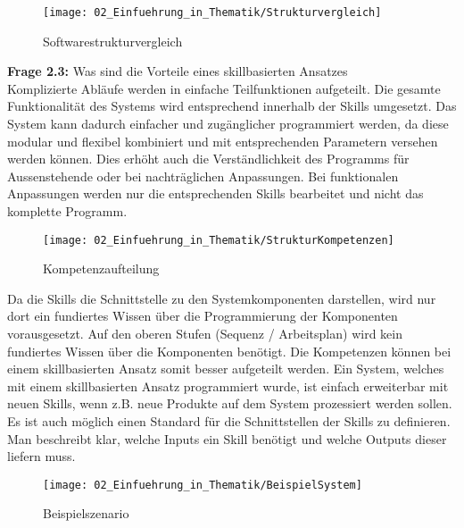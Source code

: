 		\begin{figure}[h!]
			\centering
			\texttt{[image: 02\_Einfuehrung\_in\_Thematik/Strukturvergleich]}
			\captionsetup{justification=centering}
			\caption{Softwarestrukturvergleich}
			\label{fig:Softwarestrukturvergleich}
		\end{figure}
	
	\vspace{3mm}
	
	\textbf{Frage 2.3:} Was sind die Vorteile eines skillbasierten Ansatzes \vspace{2mm} 
	\\
		Komplizierte Abläufe werden in einfache Teilfunktionen aufgeteilt. Die gesamte Funktionalität des Systems wird entsprechend innerhalb der Skills umgesetzt. Das System kann dadurch einfacher und zugänglicher programmiert werden, da diese modular und flexibel kombiniert und mit entsprechenden Parametern versehen werden können. Dies erhöht auch die Verständlichkeit des Programms für Aussenstehende oder bei nachträglichen Anpassungen. 
		Bei funktionalen Anpassungen werden nur die entsprechenden Skills bearbeitet und nicht das komplette Programm.
		\\
		\begin{wrapfigure}{l}{0.35\textwidth}
			\centering
			\texttt{[image: 02\_Einfuehrung\_in\_Thematik/StrukturKompetenzen]}
			\captionsetup{justification=centering}
			\caption{Kompetenzaufteilung}
			\label{fig:Kompetenzaufteilung}
		\end{wrapfigure}
		Da die Skills die Schnittstelle zu den Systemkomponenten darstellen, wird nur dort ein fundiertes Wissen über die Programmierung der Komponenten vorausgesetzt. Auf den oberen Stufen (Sequenz / Arbeitsplan) wird kein fundiertes Wissen über die Komponenten benötigt. Die Kompetenzen können bei einem skillbasierten Ansatz somit besser aufgeteilt werden. 
		Ein System, welches mit einem skillbasierten Ansatz programmiert wurde, ist einfach erweiterbar mit neuen Skills, wenn z.B. neue Produkte auf dem System prozessiert werden sollen. Es ist auch möglich einen Standard für die Schnittstellen der Skills zu definieren. Man beschreibt klar, welche Inputs ein Skill benötigt und welche Outputs dieser liefern muss.
		\begin{wrapfigure}{r}{0.4\textwidth}
			\centering
			\texttt{[image: 02\_Einfuehrung\_in\_Thematik/BeispielSystem]}
			\captionsetup{justification=centering}
			\caption{Beispielszenario}
			\label{fig:Beispielszenario}
		\end{wrapfigure} 
